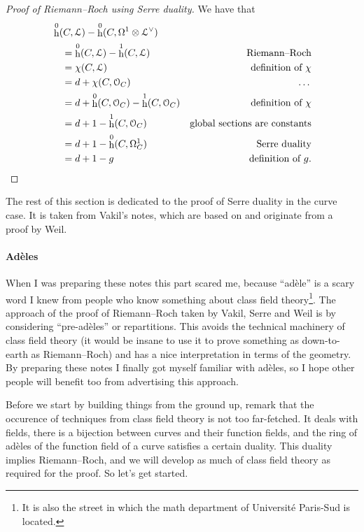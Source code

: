 \documentclass[10pt,a4paper]{article}
\theoremstyle{lecture}
\DeclareMathOperator\hh{h}
\begin{document}
\begin{proof}[Proof of Riemann--Roch using Serre duality]
  We have that
  \begin{equation}
    \begin{aligned}
      &\hh^0(C,\mathcal{L})-\hh^0(C,\Omega^1\otimes\mathcal{L}^\vee) \\
      &\quad=\hh^0(C,\mathcal{L})-\hh^1(C,\mathcal{L}) & \text{Riemann--Roch} \\
      &\quad=\chi(C,\mathcal{L}) & \text{definition of~$\chi$} \\
      &\quad=d+\chi(C,\mathcal{O}_C) & \text{\dots} \\
      &\quad=d+\hh^0(C,\mathcal{O}_C)-\hh^1(C,\mathcal{O}_C) & \text{definition of~$\chi$} \\
      &\quad=d+1-\hh^1(C,\mathcal{O}_C) & \text{global sections are constants} \\
      &\quad=d+1-\hh^0(C,\Omega_C^1) & \text{Serre duality} \\
      &\quad=d+1-g & \text{definition of $g$}.
    \end{aligned}
  \end{equation}
\end{proof}

The rest of this section is dedicated to the proof of Serre duality in the curve case. It is taken from Vakil's notes, which are based on \cite{serre-groupes-algebriques-et-corps-de-classes} and originate from a proof by Weil.

\paragraph{Ad\`eles}
When I was preparing these notes this part scared me, because ``ad\`ele'' is a scary word I knew from people who know something about class field theory\footnote{It is also the street in which the math department of Universit\'e Paris-Sud is located.}. The approach of the proof of Riemann--Roch taken by Vakil, Serre and Weil is by considering ``pre-ad\`eles'' or repartitions. This avoids the technical machinery of class field theory (it would be insane to use it to prove something as down-to-earth as Riemann--Roch) and has a nice interpretation in terms of the geometry. By preparing these notes I finally got myself familiar with ad\`eles, so I hope other people will benefit too from advertising this approach.

Before we start by building things from the ground up, remark that the occurence of techniques from class field theory is not too far-fetched. It deals with fields, there is a bijection between curves and their function fields\addreference, and the ring of ad\`eles of the function field of a curve satisfies a certain duality\addreference. This duality implies Riemann--Roch, and we will develop as much of class field theory as required for the proof. So let's get started.
\end{document}
